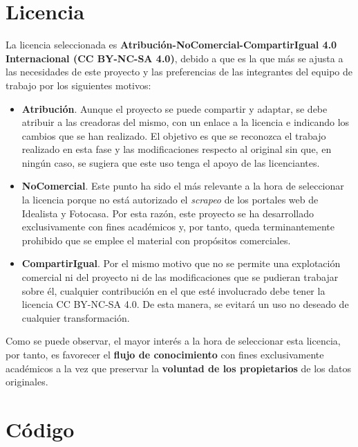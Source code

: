 \documentclass[12pt]{article}
\begin{document}
\vspace{-1.5em}\section{Licencia }\vspace{-1.5em}

La licencia seleccionada es\textbf{ Atribución-NoComercial-CompartirIgual 4.0 Internacional (CC BY-NC-SA 4.0)}, debido a que es la que más se ajusta a las necesidades de este proyecto y las preferencias de las integrantes del equipo de trabajo por los siguientes motivos:

\begin{itemize}
	\item \textbf{Atribución}. Aunque el proyecto se puede compartir y adaptar, se debe atribuir a las creadoras del mismo, con un enlace a la licencia e indicando los cambios que se han realizado. El objetivo es que se reconozca el trabajo realizado en esta fase y las modificaciones respecto al original sin que, en ningún caso, se sugiera que este uso tenga el apoyo de las licenciantes.  
	
	\item \textbf{NoComercial}. Este punto ha sido el más relevante a la hora de seleccionar la licencia porque no está autorizado el \textit{scrapeo} de los portales web de Idealista y Fotocasa. Por esta razón, este proyecto se ha desarrollado exclusivamente con fines académicos y, por tanto, queda terminantemente prohibido que se emplee el material con propósitos comerciales. 
	
	\item \textbf{CompartirIgual}. Por el mismo motivo que no se permite una explotación comercial ni del proyecto ni de las modificaciones que se pudieran trabajar sobre él, cualquier contribución en el que esté involucrado debe tener la licencia CC BY-NC-SA 4.0. De esta manera, se evitará un uso no deseado de cualquier transformación.
\end{itemize}

Como se puede observar, el mayor interés a la hora de seleccionar esta licencia, por tanto, es favorecer el \textbf{flujo de conocimiento} con fines exclusivamente académicos a la vez que preservar la\textbf{ voluntad de los propietarios} de los datos originales. 

\vspace{-1.5em}\section{Código }\vspace{-1.5em}
\end{document}
